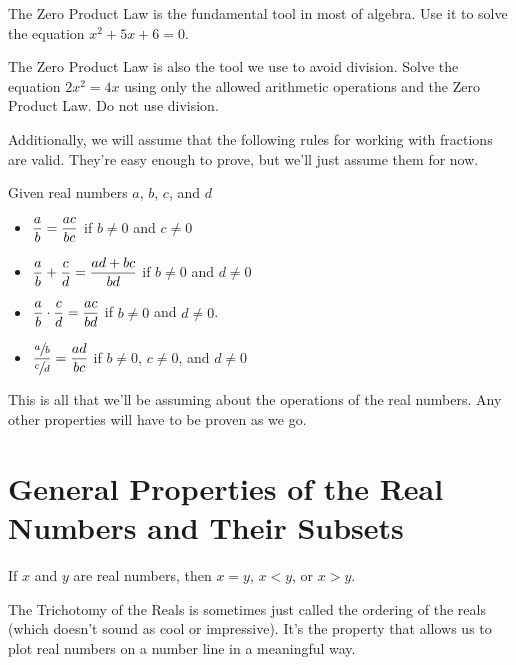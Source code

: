 \begin{question}[resume]
\item The Zero Product Law is the fundamental tool in most of algebra.  Use it to solve the equation $x^2+5x+6=0$.
\vspace{1in}
\item The Zero Product Law is also the tool we use to avoid division.  Solve the equation $2x^2=4x$ using only the allowed arithmetic operations and the Zero Product Law.  Do not use division.
\vspace{1in}
\end{question}

\noindent Additionally, we will assume that the following rules for working with fractions are valid.  They're easy enough to prove, but we'll just assume them for now.

\begin{axiom} Given real numbers $a$, $b$, $c$, and $d$
	\begin{itemize}
	\item $\displaystyle \frac{a}{b}=\frac{ac}{bc}$ if $b\neq 0$ and $c \neq 0$
	\item $\displaystyle \frac{a}{b}+\frac{c}{d} = \frac{ad+bc}{bd}$ if $b\neq 0$ and $d \neq 0$
	\item $\displaystyle \frac{a}{b} \cdot \frac{c}{d} = \frac{ac}{bd}$ if $b \neq 0$ and $d \neq 0$.
	\item $\displaystyle \frac{\sfrac{a}{b}}{\sfrac{c}{d}} = \frac{ad}{bc}$ if $b\neq 0$, $c \neq 0$, and $d \neq 0$
	\end{itemize}
\end{axiom}

\noindent This is all that we'll be assuming about the operations of the real numbers.  Any other properties will have to be proven as we go.

\section{General Properties of the Real Numbers and Their Subsets}

\begin{axiom} If $x$ and $y$ are real numbers, then $x=y$, $x<y$, or $x>y$.
\end{axiom}

\noindent The Trichotomy of the Reals is sometimes just called the ordering of the reals (which doesn't sound as cool or impressive).  It's the property that allows us to plot real numbers on a number line in a meaningful way.
	
